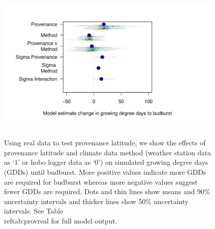 \documentclass{article}\usepackage[]{graphicx}\usepackage[]{color}
\begin{document}
\begin{figure}[H]
      \centering
      \includegraphics[height=7cm, width=11cm]{..//analyses/figures/muplot_prov_real.pdf}
      \label{fig:muplotprov}
\caption{ Using real data to test provenance latitude, we show the effects of provenance latitude and climate data method (weather station data as `1' or hobo logger data as `0') on simulated growing degree days (GDDs) until budburst. More positive values indicate more GDDs are required for budburst whereas more negative values suggest fewer GDDs are required. Dots and thin lines show means and 90\% uncertainty intervals and thicker lines show 50\% uncertainty intervals. See Table \\ref{tab:provreal} for full model output.}
\label{fig:prov}
\end{figure}
\end{document}
